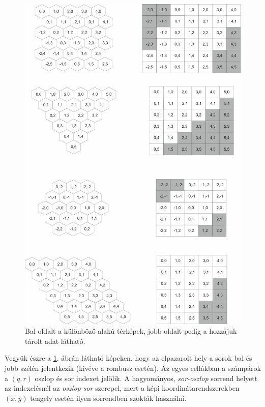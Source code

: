 \begin{figure}[h!]
\centering
\includegraphics[scale=0.2]{kepek/StorageProblem.jpg}
\caption{Bal oldalt a különböző alakú térképek, jobb oldalt pedig a hozzájuk tárolt adat látható.}
\label{fig:StorageProblem}
\end{figure}

\noindent Vegyük észre a \ref{fig:StorageProblem}. ábrán látható képeken, hogy az elpazarolt hely a sorok bal és jobb szélén jelentkezik (kivéve a rombusz esetén). Az egyes cellákban a számpárok a $(q, r)$ oszlop és sor indexet jelölik. A hagyományos, \textit{sor-oszlop} sorrend helyett az indexelésnél az \textit{oszlop-sor} szerepel, mert a képi koordinátarendszerekben $(x, y)$ tengely esetén ilyen sorrendben szokták használni.

